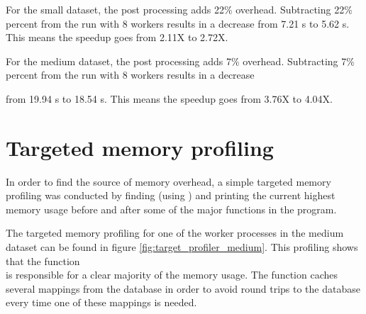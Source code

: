For the small dataset, the post processing adds 22\% overhead. Subtracting 22\% percent from the run with 8 workers results in a decrease
from 7.21 s to 5.62 s. This means the speedup goes from 2.11X to 2.72X.

For the medium dataset, the post processing adds 7\% overhead. Subtracting 7\% percent from the run with 8 workers results in a decrease

from 19.94 s to 18.54 s. This means the speedup goes from 3.76X to 4.04X.

\section{Targeted memory profiling} \label{targeted_memory_profiling}
In order to find the source of memory overhead, a simple targeted memory profiling was conducted by finding (using ) and
printing the current highest memory usage before and after some of the major functions in the program.

The targeted memory profiling for one of the worker processes in the medium dataset can be found in figure \ref{fig:target_profiler_medium}.
This profiling shows that the function \\  is responsible for a clear majority of the memory usage.
The function caches several mappings from the database in order to avoid round trips to the database every time one of these mappings is needed.

